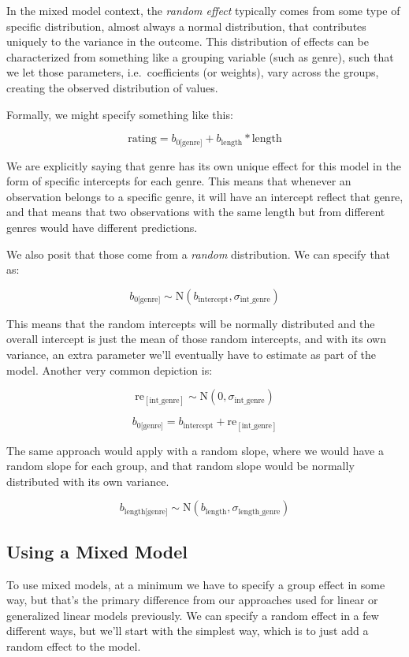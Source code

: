 \documentclass[
  letterpaper,
]{krantz}
\begin{document}
In the mixed model context, the \emph{random effect} typically comes
from some type of specific distribution, almost always a normal
distribution, that contributes uniquely to the variance in the outcome.
This distribution of effects can be characterized from something like a
grouping variable (such as genre), such that we let those parameters,
i.e.~coefficients (or weights), vary across the groups, creating the
observed distribution of values.

Formally, we might specify something like this:

\[
\text{rating} = b_{\text{0[genre]}} + b_\text{length}*\text{length}
\]

We are explicitly saying that genre has its own unique effect for this
model in the form of specific intercepts for each genre. This means that
whenever an observation belongs to a specific genre, it will have an
intercept reflect that genre, and that means that two observations with
the same length but from different genres would have different
predictions.

We also posit that those come from a \emph{random} distribution. We can
specify that as:

\[b_{\text{0[genre]}} \sim \text{N}(b_\text{intercept}, \sigma_\text{int\_genre})\]

This means that the random intercepts will be normally distributed and
the overall intercept is just the mean of those random intercepts, and
with its own variance, an extra parameter we'll eventually have to
estimate as part of the model. Another very common depiction is:

\[\text{re}_{[\text{int\_genre}]} \sim \text{N}(0, \sigma_\text{int\_genre})\]

\[b_{\text{0[genre]}} = b_\text{intercept} +\text{re}_{[\text{int\_genre}]}\]

The same approach would apply with a random slope, where we would have a
random slope for each group, and that random slope would be normally
distributed with its own variance.

\[b_{\text{length[genre]}} \sim \text{N}(b_\text{length}, \sigma_\text{length\_genre})\]

\subsection{Using a Mixed Model}\label{sec-mixed-models-using}

To use mixed models, at a minimum we have to specify a group effect in
some way, but that's the primary difference from our approaches used for
linear or generalized linear models previously. We can specify a random
effect in a few different ways, but we'll start with the simplest way,
which is to just add a random effect to the model.
\end{document}
